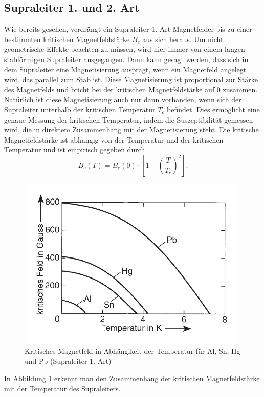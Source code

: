 \subsection{Supraleiter 1. und 2. Art}\label{arten}
Wie bereits gesehen, verdrängt ein Supraleiter 1. Art Magnetfelder bis zu einer bestimmten kritischen Magnetfeldstärke $B_c$ aus sich heraus. Um nicht geometrische Effekte beachten zu müssen, wird hier immer von einem langen stabförmigen Supraleiter ausgegangen. Dann kann gesagt werden, dass sich in dem Supraleiter eine Magnetisierung ausprägt, wenn ein Magnetfeld angelegt wird, das parallel zum Stab ist. Diese Magnetisierung ist proportional zur Stärke des Magnetfelds und bricht bei der kritischen Magnetfeldstärke auf $0$ zusammen. Natürlich ist diese Magnetisierung auch nur dann vorhanden, wenn sich der Supraleiter unterhalb der kritischen Temperatur $T_c$ befindet. Dies ermöglicht eine genaue Messung der kritischen Temperatur, indem die Suszeptibilität gemessen wird, die in direktem Zusammenhang mit der Magnetisierung steht. Die kritische Magnetfeldstärke ist abhängig von der Temperatur und der kritischen Temperatur und ist empirisch gegeben durch
\begin{equation}
 B_c(T)=B_c(0)\cdot \left[1-\left(\frac{T}{T_c}\right)^2\right].
\end{equation}
\begin{figure}[htbp]  
     \includegraphics[width=0.99\textwidth]{1_art.png}
  \caption{Kritisches Magnetfeld in Abhängikeit der Temperatur für Al, Sn, Hg und Pb (Supraleiter 1. Art) \cite{supraleitung}}
  \label{1.art}
\end{figure}
In Abbildung \ref{1.art} erkennt man den Zusammenhang der kritischen Magnetfeldstärke mit der Temperatur des Supraleiters.

